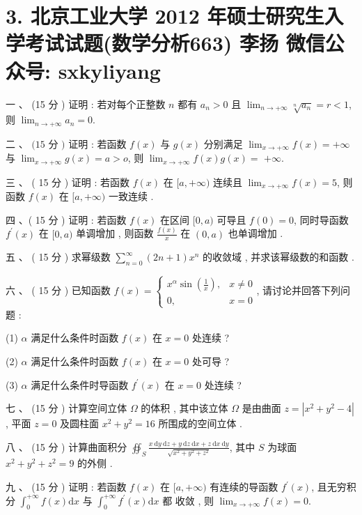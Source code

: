 \documentclass[10pt]{article}
\begin{document}
{\section{3. 北京工业大学 2012 年硕士研究生入学考试试题(数学分析663) 
 李扬 
 微信公众号: sxkyliyang}
 一 、 (15  分 )  证明 :  若对每个正整数  $n$  都有  $a_{n}>0$  且  $\lim _{n \rightarrow+\infty} \sqrt[n]{a_{n}}=r<1$,  则  $\lim _{n \rightarrow+\infty} a_{n}=0$.

 二 、 $(15$  分  $)$  证明 :  若函数  $f(x)$  与  $g(x)$  分别满足  $\lim _{x \rightarrow+\infty} f(x)=+\infty$  与  $\lim _{x \rightarrow+\infty} g(x)=a>o$,  则  $\lim _{x \rightarrow+\infty} f(x) g(x)=$ $+\infty$.

 三 、 ( 15  分 )  证明 :  若函数  $f(x)$  在  $[a,+\infty)$  连续且  $\lim _{x \rightarrow+\infty} f(x)=5$,  则函数  $f(x)$  在  $[a,+\infty)$  一致连续 .

 四 、( 15  分 )  证明 :  若函数  $f(x)$  在区间  $[0, a)$  可导且  $f(0)=0$,  同时导函数  $f^{\prime}(x)$  在  $[0, a)$  单调增加 ,  则函数  $\frac{f(x)}{x}$  在  $(0, a)$  也单调增加 .

 五 、 ( 15  分 )  求幂级数  $\sum_{n=0}^{\infty}(2 n+1) x^{n}$  的收敛域 ,  并求该幂级数的和函数 .

 六 、 ( 15  分 )  已知函数  $f(x)=\left\{\begin{array}{cc}x^{\alpha} \sin \left(\frac{1}{x}\right), & x \neq 0 \\ 0, & x=0\end{array}\right.$,  请讨论并回答下列问题 :

(1) $\alpha$  满足什么条件时函数  $f(x)$  在  $x=0$  处连续 ?

(2) $\alpha$  满足什么条件时函数  $f(x)$  在  $x=0$  处可导 ?

(3) $\alpha$  满足什么条件时导函数  $f^{\prime}(x)$  在  $x=0$  处连续 ?

 七 、 (15  分 )  计算空间立体  $\Omega$  的体积 ,  其中该立体  $\Omega$  是由曲面  $z=\left|x^{2}+y^{2}-4\right|$,  平面  $z=0$  及圆柱面  $x^{2}+y^{2}=16$  所围成的空间立体 .

 八 、 (15  分 )  计算曲面积分  $\oiint_{S} \frac{x \mathrm{~d} y \mathrm{~d} z+y \mathrm{~d} z \mathrm{~d} x+z \mathrm{~d} x \mathrm{~d} y}{\sqrt{x^{2}+y^{2}+z^{2}}}$,  其中  $S$  为球面  $x^{2}+y^{2}+z^{2}=9$  的外侧 .

 九 、 (15  分 )  证明 :  若函数  $f(x)$  在  $[a,+\infty)$  有连续的导函数  $f^{\prime}(x)$,  且无穷积分  $\int_{0}^{+\infty} f(x) \mathrm{d} x$  与  $\int_{0}^{+\infty} f^{\prime}(x) \mathrm{d} x$  都   收敛 ,  则  $\lim _{x \rightarrow+\infty} f(x)=0$.

}
\end{document}
